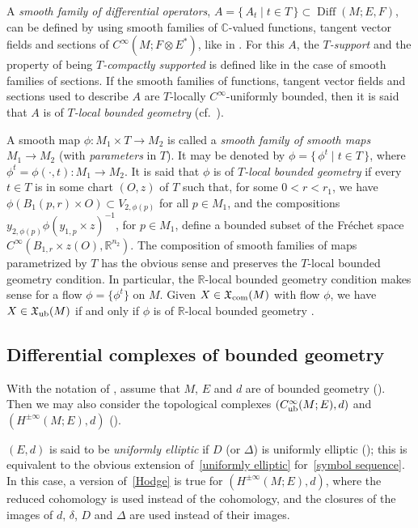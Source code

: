 \documentclass{memo-l}
\theoremstyle{plain}
\theoremstyle{definition}
\theoremstyle{remark}
\newcommand{\C}{\mathbb{C}}
\newcommand{\R}{\mathbb{R}}
\newcommand{\fX}{\mathfrak{X}}
\newcommand{\Diff}{\operatorname{Diff}}
\newcommand{\Cinftyub}{C^\infty_{\text{\rm ub}}}
\newcommand{\fXcom}{\fX_{\text{\rm com}}}
\newcommand{\fXub}{\fX_{\text{\rm ub}}}
\numberwithin{section}{chapter}
\numberwithin{equation}{section}%
\begin{document}
A \emph{smooth family of differential operators}, $A=\{\,A_t\mid t\in T\,\}\subset\Diff(M;E,F)$, can be defined by using smooth families of $\C$-valued functions, tangent vector fields and sections of $C^\infty(M;F\otimes E^*)$, like in . For this $A$, the \emph{$T$-support} and the property of being \emph{$T$-compactly supported} is defined like in the case of smooth families of sections. If the smooth families of functions, tangent vector fields and sections used to describe $A$ are $T$-locally $C^\infty$-uniformly bounded, then it is said that $A$ is of \emph{$T$-local bounded geometry} (cf.\ ).

A smooth map $\phi:M_1\times T\to M_2$ is called a \emph{smooth family of smooth maps} $M_1\to M_2$ (with \emph{parameters} in $T$). It may be denoted by $\phi=\{\,\phi^t\mid t\in T\,\}$, where $\phi^t=\phi(\cdot,t):M_1\to M_2$. It is said that $\phi$ is of \emph{$T$-local bounded geometry} if every $t\in T$ is in some chart $(O,z)$ of $T$ such that, for some $0<r<r_1$, we have $\phi(B_1(p,r)\times O)\subset V_{2,\phi(p)}$ for all $p\in M_1$, and the compositions $y_{2,\phi(p)}\phi(y_{1,p}\times z)^{-1}$, for $p\in M_1$, define a bounded subset of the Fr\'echet space $C^\infty(B_{1,r}\times z(O),\R^{n_2})$. The composition of smooth families of maps parametrized by $T$ has the obvious sense and preserves the $T$-local bounded geometry condition. In particular, the $\R$-local bounded geometry condition makes sense for a flow $\phi=\{\phi^t\}$ on $M$. Given $X\in\fXcom(M)$ with flow $\phi$, we have $X\in\fXub(M)$ if and only if $\phi$ is of $\R$-local bounded geometry \cite[Proposition~3.18]{AlvKordyLeichtnam2020}.



\subsection{Differential complexes of bounded geometry}\label{ss: diff complexes of bd geom}

With the notation of , assume that $M$, $E$ and $d$ are of bounded geometry (). Then we may also consider the topological complexes $(\Cinftyub(M;E),d)$ and $(H^{\pm\infty}(M;E),d)$ ().

$(E,d)$ is said to be \emph{uniformly elliptic} if $D$ (or $\Delta$) is uniformly elliptic (); this is equivalent to the obvious extension of~\eqref{uniformly elliptic} for~\eqref{symbol sequence}. In this case, a version of~\eqref{Hodge} is true for $(H^{\pm\infty}(M;E),d)$, where the reduced cohomology is used instead of the cohomology, and the closures of the images of $d$, $\delta$, $D$ and $\Delta$ are used instead of their images. 
\end{document}

